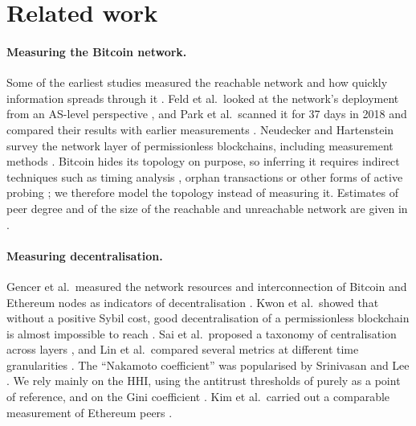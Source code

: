 \documentclass[10pt,a4paper]{article}
\begin{document}
\section{Related work}\label{sec:related}

\paragraph{Measuring the Bitcoin network.} Some of the earliest studies measured the reachable network and how quickly information spreads through it \cite{decker2013propagation,donet2014p2p}. Feld et al.\ looked at the network's deployment from an AS-level perspective \cite{feld2014aslevel}, and Park et al.\ scanned it for 37 days in 2018 and compared their results with earlier measurements \cite{park2019nodes}. Neudecker and Hartenstein survey the network layer of permissionless blockchains, including measurement methods \cite{neudecker2019survey}. Bitcoin hides its topology on purpose, so inferring it requires indirect techniques such as timing analysis \cite{neudecker2016timing}, orphan transactions \cite{delgado2019txprobe} or other forms of active probing \cite{essaid2023nodeprobe}; we therefore model the topology instead of measuring it. Estimates of peer degree and of the size of the reachable and unreachable network are given in \cite{grundmann2022degree,grundmann2022size,wang2017unreachable}.

\paragraph{Measuring decentralisation.} Gencer et al.\ measured the network resources and interconnection of Bitcoin and Ethereum nodes as indicators of decentralisation \cite{gencer2018decentralization}. Kwon et al.\ showed that without a positive Sybil cost, good decentralisation of a permissionless blockchain is almost impossible to reach \cite{kwon2019impossibility}. Sai et al.\ proposed a taxonomy of centralisation across layers \cite{sai2021taxonomy}, and Lin et al.\ compared several metrics at different time granularities \cite{lin2021measuring}. The ``Nakamoto coefficient'' was popularised by Srinivasan and Lee \cite{srinivasan2017quantifying}. We rely mainly on the HHI, using the antitrust thresholds of \cite{doj2023merger} purely as a point of reference, and on the Gini coefficient \cite{ceriani2011gini}. Kim et al.\ carried out a comparable measurement of Ethereum peers \cite{kim2018ethereum}.
\end{document}
